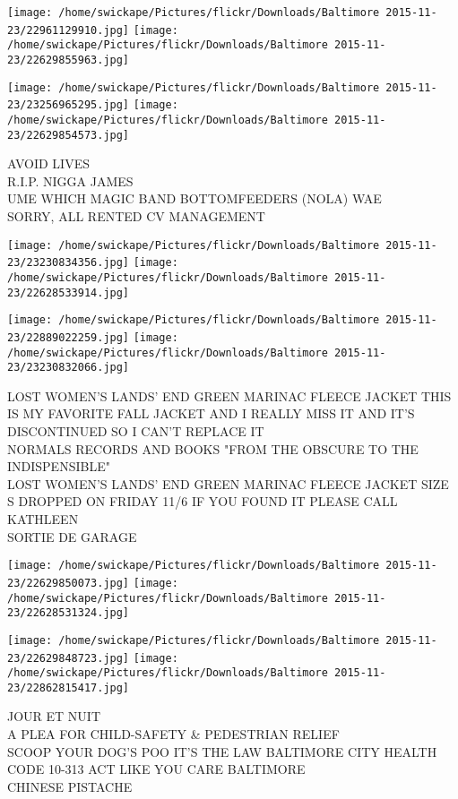 \documentclass[10pt,letterpaper]{article}
\begin{document}
\texttt{[image: /home/swickape/Pictures/flickr/Downloads/Baltimore 2015-11-23/22961129910.jpg]}
\texttt{[image: /home/swickape/Pictures/flickr/Downloads/Baltimore 2015-11-23/22629855963.jpg]}

\texttt{[image: /home/swickape/Pictures/flickr/Downloads/Baltimore 2015-11-23/23256965295.jpg]}
\texttt{[image: /home/swickape/Pictures/flickr/Downloads/Baltimore 2015-11-23/22629854573.jpg]}

AVOID LIVES\\
R.I.P. NIGGA JAMES\\
UME WHICH MAGIC BAND BOTTOMFEEDERS (NOLA) WAE\\
SORRY, ALL RENTED CV MANAGEMENT
\pagebreak

\texttt{[image: /home/swickape/Pictures/flickr/Downloads/Baltimore 2015-11-23/23230834356.jpg]}
\texttt{[image: /home/swickape/Pictures/flickr/Downloads/Baltimore 2015-11-23/22628533914.jpg]}

\texttt{[image: /home/swickape/Pictures/flickr/Downloads/Baltimore 2015-11-23/22889022259.jpg]}
\texttt{[image: /home/swickape/Pictures/flickr/Downloads/Baltimore 2015-11-23/23230832066.jpg]}

LOST WOMEN'S LANDS' END GREEN MARINAC FLEECE JACKET THIS IS MY FAVORITE FALL JACKET AND I REALLY MISS IT AND IT'S DISCONTINUED SO I CAN'T REPLACE IT\\
NORMALS RECORDS AND BOOKS "FROM THE OBSCURE TO THE INDISPENSIBLE"\\
LOST WOMEN'S LANDS' END GREEN MARINAC FLEECE JACKET SIZE S DROPPED ON FRIDAY 11/6 IF YOU FOUND IT PLEASE CALL KATHLEEN\\
SORTIE DE GARAGE
\pagebreak

\texttt{[image: /home/swickape/Pictures/flickr/Downloads/Baltimore 2015-11-23/22629850073.jpg]}
\texttt{[image: /home/swickape/Pictures/flickr/Downloads/Baltimore 2015-11-23/22628531324.jpg]}

\texttt{[image: /home/swickape/Pictures/flickr/Downloads/Baltimore 2015-11-23/22629848723.jpg]}
\texttt{[image: /home/swickape/Pictures/flickr/Downloads/Baltimore 2015-11-23/22862815417.jpg]}

JOUR ET NUIT\\
A PLEA FOR CHILD{-}SAFETY \& PEDESTRIAN RELIEF\\
SCOOP YOUR DOG'S POO IT'S THE LAW BALTIMORE CITY HEALTH CODE 10{-}313 ACT LIKE YOU CARE BALTIMORE\\
CHINESE PISTACHE
\pagebreak
\end{document}
